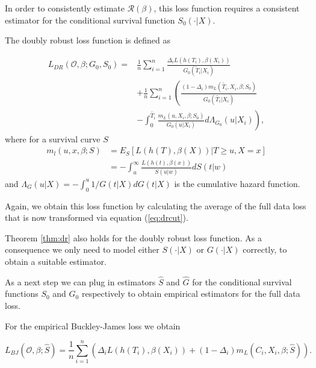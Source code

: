 \documentclass[12pt, a4paper]{article}
\theoremstyle{definition}
\theoremstyle{plain}
\numberwithin{equation}{section}
\numberwithin{figure}{section}
\numberwithin{table}{section}
\begin{document}
	In order to consistently estimate $\mathcal{R}(\beta)$, this loss function requires a consistent estimator for the conditional survival function $S_0(\cdot\vert X)$.
	
	The doubly robust loss function is defined as
	
	
	\begin{equation}\label{eq:dr}
	\begin{split}
		L_{DR}(\mathcal{O}, \beta; G_0, S_0) = & \frac{1}{n} \sum_{i=1}^n \frac{\Delta_i L(h(T_i),\beta(X_i))}{G_0(\tilde{T}_i\vert X_i)}\\
		~ & + \frac{1}{n} \sum_{i=1}^n \left(\frac{(1-\Delta_i)m_L(\tilde{T_i}, X_i, \beta; S_0)}{G_0(\tilde{T_i}\vert X_i)} \right.\\
		& - \left. \int _0^{\tilde{T_i}} \frac{m_L(u, X_i, \beta; S_0)}{G_0(u \vert X_i)} d \Lambda_{G_0}(u \vert X_i) \right),
	\end{split}
	\end{equation}
	where for a survival curve $S$
	\begin{equation}\label{eq:exploss}
	\begin{split}
		m_l(u,x,\beta; S) &= E_S[L(h(T), \beta(X)) \vert T \geq u, X = x]\\
		&= - \int_u^{\infty} \frac{L(h(t), \beta(x))}{S(u \vert w)} dS(t\vert w)
	\end{split}
	\end{equation}
	and $\Lambda_G(u\vert X) = - \int_0^u  1/ G(t\vert X)dG(t \vert X)$ is the cumulative hazard function.
	
	Again, we obtain this loss function by calculating the average of the full data loss that is now transformed via equation (\ref{eq:drcut}).
	
	Theorem \ref{thm:dr} also holds for the doubly robust loss function.
	As a consequence we only need to model either $S(\cdot\vert X)$ or $G(\cdot\vert X)$ correctly, to obtain a suitable estimator.
	
	As a next step we can plug in estimators $\hat{S}$ and $\hat{G}$ for the conditional survival functions $S_0$ and $G_0$ respectively to obtain empirical estimators for the full data loss.
	
	For the empirical Buckley-James loss we obtain
	
	\begin{equation*}
	L_{BJ}(\mathcal{O}, \beta; \hat{S}) = \frac{1}{n} \sum_{i=1}^n \left( \Delta_i L(h(T_i), \beta(X_i))+(1-\Delta_i)m_L(C_i, X_i, \beta; \hat{S})\right).
	\end{equation*}
	
\end{document}
